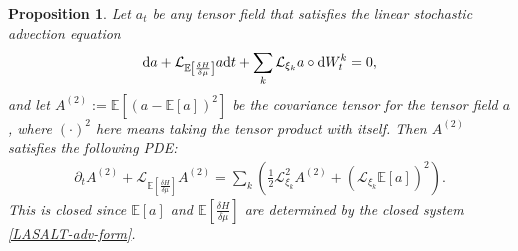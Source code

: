\documentclass[11pt, oneside]{article}   	%
\numberwithin{equation}{section}
\theoremstyle{plain}
\newtheorem{proposition}[theorem]{Proposition}
\theoremstyle{definition}
\theoremstyle{remark}
\newcommand{\<}{\langle}
\renewcommand{\>}{\rangle}
\def\diff{\textnormal{d}}
\newcommand{\E}[1]{\mathbb{E}\left[{#1}\right]}
\begin{document}
\begin{proposition} \label{covariance-eq}
Let $a_t$ be any tensor field that satisfies the linear stochastic advection equation
\begin{align}\label{a-trans-eq}
    \diff a + \mathcal L_{\E{\frac{\delta H}{\delta \mu}}} a \diff t + \displaystyle\sum_k \mathcal L_{\xi_k} a \circ \diff W_t^k = 0,
\end{align}
and let $A^{(2)} := \mathbb E\left[(a - \mathbb E[a])^2\right]$ be the covariance tensor for the tensor field $a$, where $(\cdot)^2$ here means taking the tensor product with itself.
Then $A^{(2)}$ satisfies the following PDE:
\begin{align}\label{covar-eq}
\partial_t A^{(2)} + \mathcal L_{\E{\frac{\delta H}{\delta \mu}}}A^{(2)} = \sum_k \left(\frac12 \mathcal L_{\xi_k}^2 A^{(2)} + \left(\mathcal L_{\xi_k} \E{a}\right)^2 \right).
\end{align}
This is closed since $\E{a}$ and $\E{\frac{\delta H}{\delta \mu}}$ are determined by the closed system \eqref{LASALT-adv-form}. 
\end{proposition}
\end{document}
